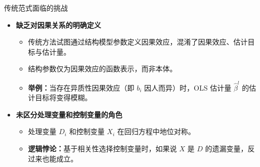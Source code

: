 \begin{frame}{传统范式面临的挑战}
\begin{itemize}
  \item \textbf{缺乏对因果关系的明确定义}
    \begin{itemize}
      \item 传统方法试图通过结构模型参数定义因果效应，混淆了因果效应、估计目标与估计量。
      \item 结构参数仅为因果效应的函数表示，而非本体。
      \item \textbf{举例：}当存在异质性因果效应（即 $b_i$ 因人而异）时，OLS 估计量 $\hat{\beta}^l$ 的估计目标将变得模糊。
    \end{itemize}
  \vspace{0.5em} %
  \item \textbf{未区分处理变量和控制变量的角色}
    \begin{itemize}
      \item 处理变量 $D_i$ 和控制变量 $X_i$ 在回归方程中地位对称。
      \item \textbf{逻辑悖论：}基于相关性选择控制变量时，如果说 $X$ 是 $D$ 的遗漏变量，反过来也能成立。
    \end{itemize}
\end{itemize}
\end{frame}